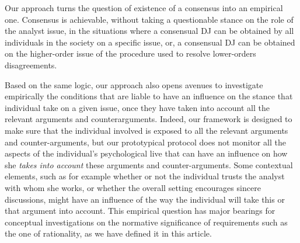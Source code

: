 \documentclass[version=3.21, pagesize, twoside=off, bibliography=totoc, DIV=calc, fontsize=12pt, a4paper, french, english]{scrartcl}
\begin{document}
Our approach turns the question of existence of a consensus into an empirical one. Consensus is achievable, without taking a questionable stance on the role of the analyst issue, in the situations where a consensual \ac{DJ} can be obtained by all individuals in the society on a specific issue, or, a consensual \ac{DJ} can be obtained on the higher-order issue of the procedure used to resolve lower-orders disagreements.

Based on the same logic, our approach also opens avenues to investigate empirically the conditions that are liable to have an influence on the stance that individual take on a given issue, once they have taken into account all the relevant arguments and counterarguments. Indeed, our framework is designed to make sure that the individual involved is exposed to all the relevant arguments and counter-arguments, but our prototypical protocol does not monitor all the aspects of the individual's psychological live that can have an influence on how she \emph{takes into account} these arguments and counter-arguments. Some contextual elements, such as for example whether or not the individual trusts the analyst with whom she works, or whether the overall setting encourages sincere discussions, might have an influence of the way the individual will take this or that argument into account. %
This empirical question has major bearings for conceptual investigations on the normative significance of requirements such as the one of rationality, as we have defined it in this article.

\end{document}
